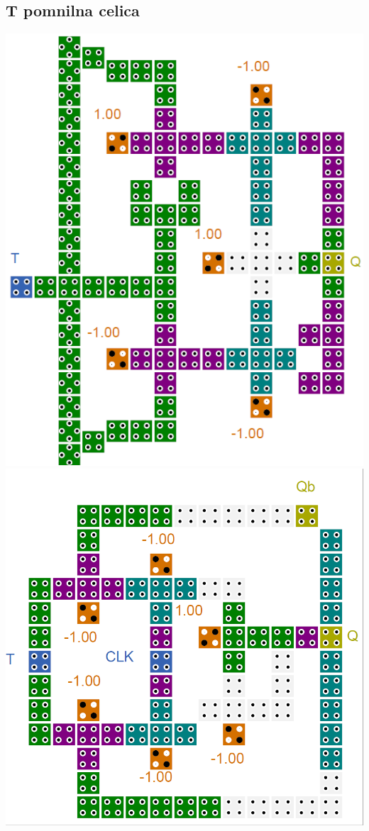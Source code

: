 \documentclass[a4paper, 11pt]{article}
\begin{document}
\subsection{T pomnilna celica}
\includegraphics[scale=0.6]{../img/vir_4/t.png} 
\includegraphics[scale=0.4]{../img/vir_5/t.png} 
\end{document}

